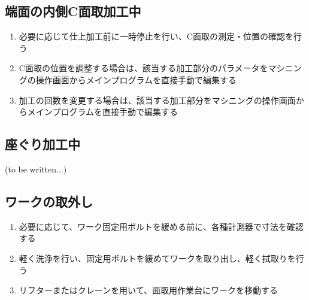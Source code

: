 \subsection{端面の内側C面取加工中}
\begin{enumerate}
\item 必要に応じて仕上加工前に一時停止を行い、C面取の測定・位置の確認を行う
\item C面取の位置を調整する場合は、該当する加工部分のパラメータをマシニングの操作画面からメインプログラムを直接手動で編集する
\item {}加工の回数を変更する場合は、該当する加工部分をマシニングの操作画面からメインプログラムを直接手動で編集する
\end{enumerate}


\clearpage
\subsection{座ぐり加工中\TBW}
(to be written...)



\clearpage


\subsection{ワークの取外し}
\begin{enumerate}
\item 必要に応じて、ワーク固定用ボルトを緩める前に、各種計測器で寸法を確認する
\item 軽く洗浄を行い、固定用ボルトを緩めてワークを取り出し、軽く拭取りを行う
\item {}リフターまたはクレーンを用いて、面取用作業台にワークを移動する
\end{enumerate}


